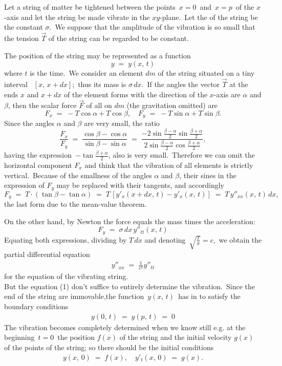\documentclass[12pt]{article}
\theoremstyle{definition}
\begin{document}
  
Let a string of  matter be tightened between the points \,$x = 0$\, and\, $x = p$\, of the $x$-axis and let the string be made vibrate in the $xy$-plane.\, Let the  of the string be the constant $\sigma$.\, We suppose that the amplitude of the vibration is so small that the tension $\vec{T}$ of the string can be regarded to be constant.

The position of the string may be represented as a function
$$y \;=\; y(x,\,t)$$
where $t$ is the time.\, We consider an element $dm$ of the string situated on a tiny interval \, $[x,\,x\!+\!dx]$;\, thus its mass is $\sigma\,dx$.\, If the angles the vector $\vec{T}$ at the ends $x$ and $x\!+\!dx$ of the element forms with the direction of the $x$-axis are $\alpha$ and $\beta$, then the scalar  force $\vec{F}$ of all  on $dm$ (the gravitation omitted) are
$$F_x \;=\; -T\cos\alpha+T\cos\beta, \quad F_y \;=\; -T\sin\alpha+T\sin\beta.$$
Since the angles $\alpha$ and $\beta$ are very small, the ratio
$$\frac{F_x}{F_y} \;=\; \frac{\cos\beta-\cos\alpha}{\sin\beta-\sin\alpha} \;=\; 
\frac{-2\sin\frac{\beta-\alpha}{2}\sin\frac{\beta+\alpha}{2}}{2\sin\frac{\beta-\alpha}{2}\cos\frac{\beta+\alpha}{2}},$$
having the expression \,$-\tan\frac{\beta+\alpha}{2}$, also is very small.\, Therefore we can omit the horizontal component $F_x$ and think that the vibration of all elements is strictly vertical.\, Because of the smallness of the angles $\alpha$ and $\beta$, their sines in the expression of 
$F_y$ may be replaced with their tangents, and accordingly
$$F_y \;=\; T\cdot(\tan\beta-\tan\alpha) \;=\; T\,[y'_x(x\!+\!dx,\,t)-y'_x(x,\,t)] \;=\; T\,y''_{xx}(x,\,t)\,dx,$$
the last form due to the mean-value theorem.

On the other hand, by Newton the force equals the mass times the acceleration:
$$F_y \;=\; \sigma\,dx\,y''_{tt}(x,\,t)$$
Equating both expressions, dividing by $T\,dx$ and denoting\, $\displaystyle\sqrt{\frac{T}{\sigma}} = c$,\, we obtain the partial differential equation
\begin{align}
y''_{xx} \;=\; \frac{1}{c^2}y''_{tt}
\end{align}
for the equation of the  vibrating string.\\

But the equation (1) don't suffice to entirely determine the vibration.\, Since the end of the string are immovable,the function\, $y(x,\,t)$\, has in  to satisfy the boundary conditions
\begin{align}
y(0,\,t) \;=\; y(p,\,t) \;=\; 0
\end{align}
The vibration becomes completely determined when we know still e.g. at the beginning\, $t = 0$\, the position $f(x)$ of the string and the initial velocity $g(x)$ of the points of the string; so there should be the initial conditions
\begin{align}
y(x,\,0) \;=\; f(x), \quad y'_t(x,\,0) \;=\; g(x).
\end{align}
\end{document}
